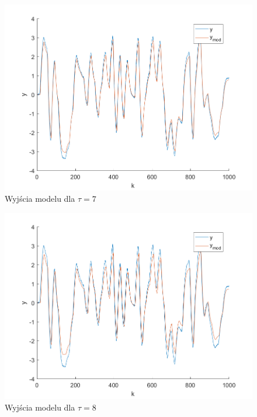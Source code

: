 \documentclass[a4paper, 10pt]{article}
\begin{document}
	\begin{figure}[H]
	\centering
	\includegraphics[width=0.9\linewidth]{z1_7}
	\caption{Wyjścia modelu dla $\tau=7$}
	\label{fig:z1_7}
	\end{figure}
	\begin{figure}[H]
	\centering
	\includegraphics[width=0.9\linewidth]{z1_8}
	\caption{Wyjścia modelu dla $\tau=8$}
	\label{fig:z1_8}
	\end{figure}
\end{document}
